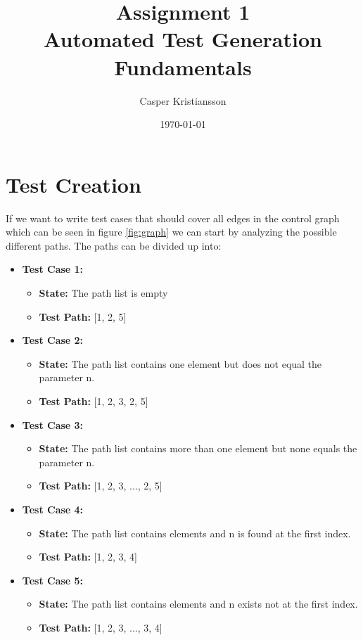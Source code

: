 \documentclass{article}
\title{Assignment 1\\Automated Test Generation Fundamentals}
\author{Casper Kristiansson}
\date{\today}
\begin{document}
\maketitle

\section{Test Creation}

If we want to write test cases that should cover all edges in the control graph which can be seen in figure \ref{fig:graph} we can start by analyzing the possible different paths. The paths can be divided up into:

\begin{itemize}
    \item \textbf{Test Case 1:}
    \begin{itemize}
        \item \textbf{State:} The path list is empty
        \item \textbf{Test Path:} [1, 2, 5]
    \end{itemize}
    \item \textbf{Test Case 2:}
    \begin{itemize}
        \item \textbf{State:} The path list contains one element but does not equal the parameter n.
        \item \textbf{Test Path:} [1, 2, 3, 2, 5]
    \end{itemize}
    \item \textbf{Test Case 3:}
    \begin{itemize}
        \item \textbf{State:} The path list contains more than one element but none equals the parameter n.
        \item \textbf{Test Path:} [1, 2, 3, ..., 2, 5]
    \end{itemize}
    \item \textbf{Test Case 4:}
    \begin{itemize}
        \item \textbf{State:} The path list contains elements and n is found at the first index.
        \item \textbf{Test Path:} [1, 2, 3, 4]
    \end{itemize}
    \item \textbf{Test Case 5:}
    \begin{itemize}
        \item \textbf{State:} The path list contains elements and n exists not at the first index.
        \item \textbf{Test Path:} [1, 2, 3, ..., 3, 4]
    \end{itemize}
\end{itemize}
\end{document}

